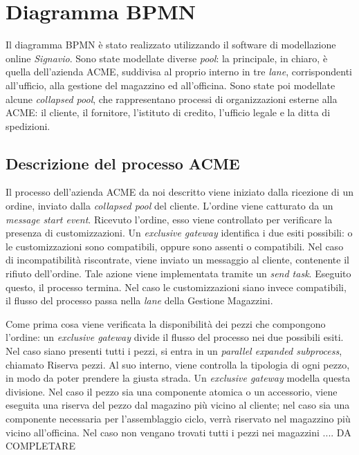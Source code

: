 \section{Diagramma BPMN}
Il diagramma BPMN \`e stato realizzato utilizzando il software di
modellazione online \textit{Signavio}.
Sono state modellate diverse \textit{pool}: la principale, in chiaro,
\`e quella dell'azienda ACME, suddivisa al proprio interno in tre
\textit{lane}, corrispondenti all'ufficio, alla gestione del magazzino
ed all'officina.
Sono state poi modellate alcune \textit{collapsed pool}, che
rappresentano processi di organizzazioni esterne alla ACME: il cliente,
il fornitore, l'istituto di credito, l'ufficio legale e la ditta di
spedizioni.

\subsection{Descrizione del processo ACME}
Il processo dell'azienda ACME da noi descritto viene iniziato dalla
ricezione di un ordine, inviato dalla \textit{collapsed pool} del
cliente.
L'ordine viene catturato da un \textit{message start event}.
Ricevuto l'ordine, esso viene controllato per verificare la presenza di customizzazioni. Un \textit{exclusive gateway} identifica i due esiti possibili: o le customizzazioni sono compatibili, oppure sono assenti o compatibili.
Nel caso di incompatibilit\`a riscontrate, viene inviato un messaggio al cliente, contenente il rifiuto dell'ordine. Tale azione viene implementata tramite un \textit{send task}. Eseguito questo, il processo termina.
Nel caso le customizzazioni siano invece compatibili, il flusso del processo passa nella \textit{lane} della Gestione Magazzini.

Come prima cosa viene verificata la disponibilit\`a dei pezzi che compongono l'ordine: un \textit{exclusive gateway} divide il flusso del processo nei due possibili esiti.
Nel caso siano presenti tutti i pezzi, si entra in un \textit{parallel expanded subprocess}, chiamato Riserva pezzi. Al suo interno, viene controlla la tipologia di ogni pezzo, in modo da poter prendere la giusta strada. Un \textit{exclusive gateway} modella questa divisione. Nel caso il pezzo sia una componente atomica o un accessorio, viene eseguita una riserva del pezzo dal magazino pi\`u vicino al cliente; nel caso sia una componente necessaria per l'assemblaggio ciclo, verr\`a riservato nel magazzino pi\`u vicino all'officina.
Nel caso non vengano trovati tutti i pezzi nei magazzini .... DA COMPLETARE

